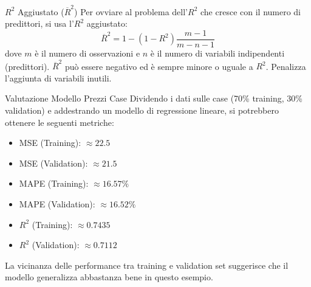 \documentclass{article}
\begin{document}
\begin{definitionbox}{$R^2$ Aggiustato ($\overline{R}^2$)}
    Per ovviare al problema dell'$R^2$ che cresce con il numero di predittori, si usa l'$R^2$ aggiustato:
    $$ \overline{R}^2 = 1 - (1 - R^2) \frac{m-1}{m-n-1} $$
    dove $m$ è il numero di osservazioni e $n$ è il numero di variabili indipendenti (predittori). $\overline{R}^2$ può essere negativo ed è sempre minore o uguale a $R^2$. Penalizza l'aggiunta di variabili inutili.
\end{definitionbox}

\begin{examplebox}{Valutazione Modello Prezzi Case}
    Dividendo i dati sulle case (70\% training, 30\% validation) e addestrando un modello di regressione lineare, si potrebbero ottenere le seguenti metriche:
    \begin{itemize}
        \item MSE (Training): $\approx 22.5$
        \item MSE (Validation): $\approx 21.5$
        \item MAPE (Training): $\approx 16.57\%$
        \item MAPE (Validation): $\approx 16.52\%$
        \item $R^2$ (Training): $\approx 0.7435$
        \item $R^2$ (Validation): $\approx 0.7112$
    \end{itemize}
    La vicinanza delle performance tra training e validation set suggerisce che il modello generalizza abbastanza bene in questo esempio.
\end{examplebox}
\end{document}
